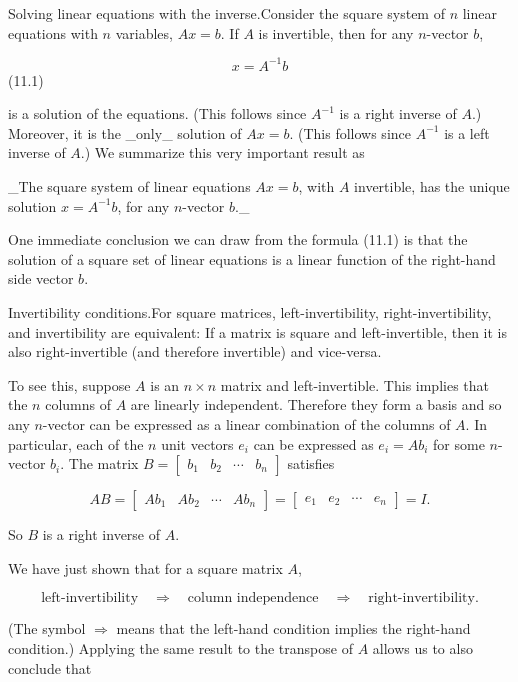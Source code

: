
Solving linear equations with the inverse.Consider the square system of \(n\) linear equations with \(n\) variables, \(Ax=b\). If \(A\) is invertible, then for any \(n\)-vector \(b\),

\[x=A^{-1}b\] (11.1)

is a solution of the equations. (This follows since \(A^{-1}\) is a right inverse of \(A\).) Moreover, it is the _only_ solution of \(Ax=b\). (This follows since \(A^{-1}\) is a left inverse of \(A\).) We summarize this very important result as

_The square system of linear equations \(Ax=b\), with \(A\) invertible, has the unique solution \(x=A^{-1}b\), for any \(n\)-vector \(b\)._

One immediate conclusion we can draw from the formula (11.1) is that the solution of a square set of linear equations is a linear function of the right-hand side vector \(b\).

Invertibility conditions.For square matrices, left-invertibility, right-invertibility, and invertibility are equivalent: If a matrix is square and left-invertible, then it is also right-invertible (and therefore invertible) and vice-versa.

To see this, suppose \(A\) is an \(n\times n\) matrix and left-invertible. This implies that the \(n\) columns of \(A\) are linearly independent. Therefore they form a basis and so any \(n\)-vector can be expressed as a linear combination of the columns of \(A\). In particular, each of the \(n\) unit vectors \(e_{i}\) can be expressed as \(e_{i}=Ab_{i}\) for some \(n\)-vector \(b_{i}\). The matrix \(B=\left[\begin{array}{cccc}b_{1}&b_{2}&\cdots&b_{n}\end{array}\right]\) satisfies

\[AB=\left[\begin{array}{cccc}Ab_{1}&Ab_{2}&\cdots&Ab_{n}\end{array}\right]= \left[\begin{array}{cccc}e_{1}&e_{2}&\cdots&e_{n}\end{array}\right]=I.\]

So \(B\) is a right inverse of \(A\).

We have just shown that for a square matrix \(A\),

\[\mbox{left-invertibility}\quad\Longrightarrow\quad\mbox{column independence}\quad \Longrightarrow\quad\mbox{right-invertibility}.\]

(The symbol \(\Longrightarrow\) means that the left-hand condition implies the right-hand condition.) Applying the same result to the transpose of \(A\) allows us to also conclude that

